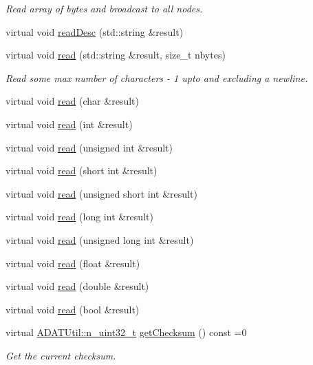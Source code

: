 \begin{DoxyCompactItemize}
\begin{DoxyCompactList}\small\item\em Read array of bytes and broadcast to all nodes. \end{DoxyCompactList}\item 
virtual void \mbox{\hyperlink{classADATIO_1_1BinaryReader_a70de2f31f59d9846f4ee688c3590bf31}{read\+Desc}} (std\+::string \&result)
\item 
virtual void \mbox{\hyperlink{classADATIO_1_1BinaryReader_a4d79cabea18fccc818eaf2c45ed21b1f}{read}} (std\+::string \&result, size\+\_\+t nbytes)
\begin{DoxyCompactList}\small\item\em Read some max number of characters -\/ 1 upto and excluding a newline. \end{DoxyCompactList}\item 
virtual void \mbox{\hyperlink{classADATIO_1_1BinaryReader_a04c653824b3819b4b02ea5eed6fd57f5}{read}} (char \&result)
\item 
virtual void \mbox{\hyperlink{classADATIO_1_1BinaryReader_a865909a3033e753939e5d634a8fbff05}{read}} (int \&result)
\item 
virtual void \mbox{\hyperlink{classADATIO_1_1BinaryReader_ac8fdf69d46dd08e49c676202927247a4}{read}} (unsigned int \&result)
\item 
virtual void \mbox{\hyperlink{classADATIO_1_1BinaryReader_acd797e0f037099dc050f4444b13179be}{read}} (short int \&result)
\item 
virtual void \mbox{\hyperlink{classADATIO_1_1BinaryReader_a02af26ba1942510d3b9510253945b346}{read}} (unsigned short int \&result)
\item 
virtual void \mbox{\hyperlink{classADATIO_1_1BinaryReader_a5b0788893198274f244f3f04384af660}{read}} (long int \&result)
\item 
virtual void \mbox{\hyperlink{classADATIO_1_1BinaryReader_ae488df4a515666e5516d5a3c30d28f08}{read}} (unsigned long int \&result)
\item 
virtual void \mbox{\hyperlink{classADATIO_1_1BinaryReader_aa9a2094a98b7786a69a9b051b1f5d81a}{read}} (float \&result)
\item 
virtual void \mbox{\hyperlink{classADATIO_1_1BinaryReader_a20d0ff738cbb83d0b266a38c7e5466be}{read}} (double \&result)
\item 
virtual void \mbox{\hyperlink{classADATIO_1_1BinaryReader_a2239e093aff4d32cd3d717a7178d121a}{read}} (bool \&result)
\item 
virtual \mbox{\hyperlink{namespaceADATUtil_ad945a8afa4db2d1f89b731964adae97e}{A\+D\+A\+T\+Util\+::n\+\_\+uint32\+\_\+t}} \mbox{\hyperlink{classADATIO_1_1BinaryReader_acd705bb96d557a5437410b55beb40bda}{get\+Checksum}} () const =0
\begin{DoxyCompactList}\small\item\em Get the current checksum. \end{DoxyCompactList}\end{DoxyCompactItemize}
